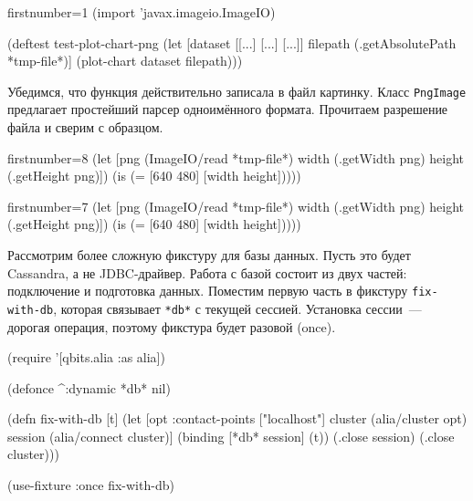 \else

\begin{english}
  \begin{clojure/lines*}{firstnumber=1}
(import 'javax.imageio.ImageIO)

(deftest test-plot-chart-png
  (let [dataset [[...] [...] [...]]
        filepath (.getAbsolutePath *tmp-file*)]
    (plot-chart dataset filepath)))
  \end{clojure/lines*}
\end{english}

\fi

\noindent
Убедимся, что функция действительно записала в файл картинку. Класс
\verb|PngImage| предлагает простейший парсер одноимённого формата. Прочитаем
разрешение файла и сверим с образцом.

\ifnarrow

\begin{english}
  \begin{clojure/lines*}{firstnumber=8}
(let [png (ImageIO/read *tmp-file*)
      width (.getWidth png)
      height (.getHeight png)])
(is (= [640 480] [width height]))))
  \end{clojure/lines*}
\end{english}

\else

\begin{english}
  \begin{clojure/lines*}{firstnumber=7}
    (let [png (ImageIO/read *tmp-file*)
          width (.getWidth png)
          height (.getHeight png)])
    (is (= [640 480] [width height]))))
  \end{clojure/lines*}
\end{english}
\fi



Рассмотрим более сложную фикстуру для базы данных. Пусть это будет Cassandra, а
не JDBC-драйвер. Работа с базой состоит из двух частей: подключение и подготовка
данных. Поместим первую часть в фикстуру \verb|fix-with-db|, которая связывает
\verb|*db*| с текущей сессией. Установка сессии~--- дорогая операция, поэтому
фикстура будет разовой (once).

\ifnarrow

\begin{english}
  \begin{clojure}
(require '[qbits.alia :as alia])

(defonce ^:dynamic *db* nil)

(defn fix-with-db [t]
  (let [opt {:contact-points
               ["localhost"]}
        cluster (alia/cluster opt)
        session (alia/connect cluster)]
    (binding [*db* session]
      (t))
    (.close session)
    (.close cluster)))

(use-fixture :once fix-with-db)
  \end{clojure}
\end{english}


